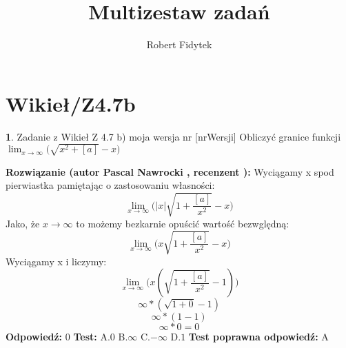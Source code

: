 \documentclass[12pt, a4paper]{article}
\title{Multizestaw zadań}
\author{Robert Fidytek}
\date{}
\theoremstyle{definition} %
\newtheorem{zad}{}
\newcommand{\kategoria}[1]{\section{#1}} %
\newcommand{\zadStart}[1]{\begin{zad}#1\newline} %
\newcommand{\zadStop}{\end{zad}}   %
\newcommand{\rozwStart}[2]{\noindent \textbf{Rozwiązanie (autor #1 , recenzent #2): }\newline} %
\newcommand{\rozwStop}{\newline}                                            %
\newcommand{\odpStart}{\noindent \textbf{Odpowiedź:}\newline}    %
\newcommand{\odpStop}{\newline}                                             %
\newcommand{\testStart}{\noindent \textbf{Test:}\newline} %
\newcommand{\testStop}{\newline} %
\newcommand{\kluczStart}{\noindent \textbf{Test poprawna odpowiedź:}\newline} %
\newcommand{\kluczStop}{\newline} %
\begin{document}
\maketitle


\kategoria{Wikieł/Z4.7b}
\zadStart{Zadanie z Wikieł Z 4.7 b) moja wersja nr [nrWersji]}
Obliczyć granice funkcji $\displaystyle{\lim_{x \to \infty}}\big(\sqrt{x^2+[a]}-x\big)$
\zadStop
\rozwStart{Pascal Nawrocki}{}
Wyciągamy x spod pierwiastka pamiętając o zastosowaniu własności:
$$\displaystyle{\lim_{x \to \infty}}\big(|x|\sqrt{1+\frac{[a]}{x^2}}-x\big)$$
Jako, że $x \to \infty$ to możemy bezkarnie opuścić wartość bezwględną:
$$\displaystyle{\lim_{x \to \infty}}\big(x\sqrt{1+\frac{[a]}{x^2}}-x\big)$$
Wyciągamy x i liczymy:
$$\displaystyle{\lim_{x \to \infty}}\big(x(\sqrt{1+\frac{[a]}{x^2}}-1)\big)$$
$$\infty*(\sqrt{1+0}-1)$$
$$\infty*(1-1)$$
$$\infty*0=0$$
\rozwStop
\odpStart
$0$
\odpStop
\testStart
A.$0$
B.$\infty$
C.$-\infty$
D.$1$
\testStop
\kluczStart
A
\kluczStop
\end{document}
